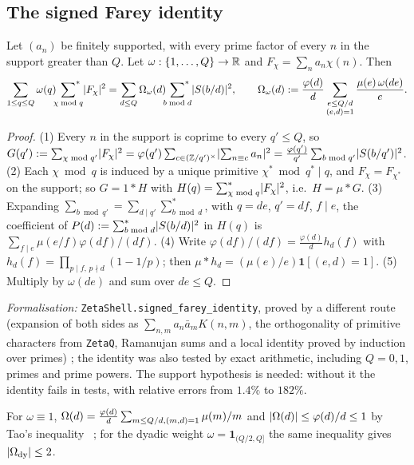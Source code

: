 \subsection{The signed Farey identity}\label{ssec:shell-farey}
\begin{lemma}[Lemma 1]\label{lem:shell-1}
Let $(a_n)$ be finitely supported, with every prime factor of every $n$ in the support greater than $Q$. Let
$\omega:\{1,\dots,Q\}\to\mathbb R$ and $F_\chi=\sum_na_n\chi(n)$. Then
\[
\sum_{1\le q\le Q}\omega(q)\sideset{}{^*}\sum_{\chi\bmod q}\lvert F_\chi\rvert^2=\sum_{d\le Q}\Omega_\omega(d)\sideset{}{^*}\sum_{b\bmod d}\lvert S(b/d)\rvert^2,\qquad
\Omega_\omega(d):=\frac{\varphi(d)}d\sum_{\substack{e\le Q/d\\(e,d)=1}}\frac{\mu(e)\,\omega(de)}e .
\]
\end{lemma}
\begin{proof}
(1) Every $n$ in the support is coprime to every $q'\le Q$, so
$G(q'):=\sum_{\chi\bmod q'}\lvert F_\chi\rvert^2=\varphi(q')\sum_{c\in(\mathbb Z/q')^\times}\lvert \sum_{n\equiv c}a_n\rvert^2=\frac{\varphi(q')}{q'}\sum_{b\bmod q'}\lvert S(b/q')\rvert^2$.
(2) Each $\chi\bmod q$ is induced by a unique primitive $\chi^*\bmod q^*\mid q$, and $F_\chi=F_{\chi^*}$ on the support; so $G=1*H$ with
$H(q)=\sum^*_{\chi\bmod q}\lvert F_\chi\rvert^2$, i.e.\ $H=\mu*G$. (3) Expanding $\sum_{b\bmod q'}=\sum_{d\mid q'}\sum^*_{b\bmod d}$, with $q=de$, $q'=df$,
$f\mid e$, the coefficient of $P(d):=\sum^*_{b\bmod d}\lvert S(b/d)\rvert^2$ in $H(q)$ is $\sum_{f\mid e}\mu(e/f)\varphi(df)/(df)$. (4) Write
$\varphi(df)/(df)=\frac{\varphi(d)}dh_d(f)$ with $h_d(f)=\prod_{p\mid f,\,p\nmid d}(1-1/p)$; then $\mu*h_d=(\mu(e)/e)\mathbf 1[(e,d)=1]$. (5) Multiply by
$\omega(de)$ and sum over $de\le Q$.
\end{proof}
\emph{Formalisation:} \texttt{ZetaShell.signed\_farey\_identity}, proved by a different route
(expansion of both sides as $\sum_{n,m}a_n\bar a_mK(n,m)$, the orthogonality of primitive characters from \texttt{ZetaQ}, Ramanujan sums
and a local identity proved by induction over primes) \tagL; the identity was also tested by exact arithmetic, including $Q=0,1$, primes and
prime powers. The support hypothesis is needed: without it the identity fails in tests, with relative errors from
$1.4\%$ to $182\%$.

For $\omega\equiv1$, $\Omega(d)=\frac{\varphi(d)}d\sum_{m\le Q/d,(m,d)=1}\mu(m)/m$ and $\lvert \Omega(d)\rvert\le\varphi(d)/d\le1$ by Tao's
inequality~\cite{Tao10} \tagC; for the dyadic weight $\omega=\mathbf 1_{(Q/2,Q]}$ the same inequality gives $\lvert \Omega_{\rm dy}\rvert\le2$.

